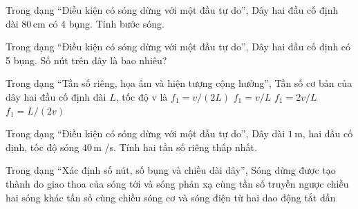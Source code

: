 \begin{ex}
Trong dạng “Điều kiện có sóng dừng với một đầu tự do”, Dây hai đầu cố định dài $80\,\text{cm}$ có 4 bụng. Tính bước sóng.
\choiceTF

\end{ex}

\begin{ex}
Trong dạng “Điều kiện có sóng dừng với một đầu tự do”, Dây hai đầu cố định có 5 bụng. Số nút trên dây là bao nhiêu?
\end{ex}

\begin{ex}
Trong dạng “Tần số riêng, họa âm và hiện tượng cộng hưởng”, Tần số cơ bản của dây hai đầu cố định dài $L$, tốc độ v là
\choice
{\True $f_1=v/(2L)$}
{$f_1=v/L$}
{$f_1=2v/L$}
{$f_1=L/(2v)$}
\end{ex}

\begin{ex}
Trong dạng “Điều kiện có sóng dừng với một đầu tự do”, Dây dài $1\,\text{m}$, hai đầu cố định, tốc độ sóng $40\,\text{m}$ /s. Tính hai tần số riêng thấp nhất.
\choiceTF

\end{ex}

\begin{ex}
Trong dạng “Xác định số nút, số bụng và chiều dài dây”, Sóng dừng được tạo thành do giao thoa của
\choice
{\True sóng tới và sóng phản xạ cùng tần số truyền ngược chiều}
{hai sóng khác tần số cùng chiều}
{sóng cơ và sóng điện từ}
{hai dao động tắt dần}
\end{ex}

